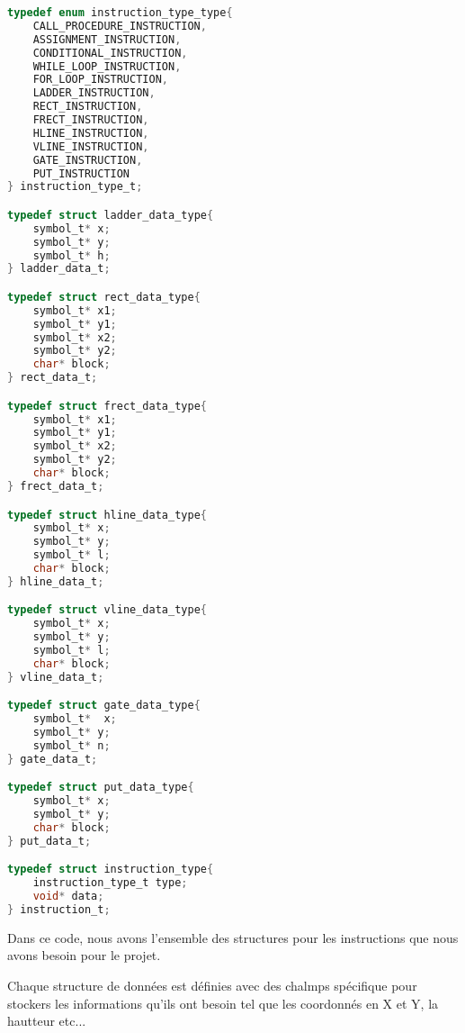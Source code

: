 \lstset{style=mystyle}
\begin{lstlisting}[language=C, caption=Structure pour une instruction]
typedef enum instruction_type_type{
    CALL_PROCEDURE_INSTRUCTION,
    ASSIGNMENT_INSTRUCTION,
    CONDITIONAL_INSTRUCTION,
    WHILE_LOOP_INSTRUCTION,
    FOR_LOOP_INSTRUCTION,
    LADDER_INSTRUCTION,
    RECT_INSTRUCTION,
    FRECT_INSTRUCTION,
    HLINE_INSTRUCTION,
    VLINE_INSTRUCTION,
    GATE_INSTRUCTION,
    PUT_INSTRUCTION
} instruction_type_t;

typedef struct ladder_data_type{
    symbol_t* x;
    symbol_t* y;
    symbol_t* h;
} ladder_data_t;

typedef struct rect_data_type{
    symbol_t* x1;
    symbol_t* y1;
    symbol_t* x2;
    symbol_t* y2;
    char* block;
} rect_data_t;

typedef struct frect_data_type{
    symbol_t* x1;
    symbol_t* y1;
    symbol_t* x2;
    symbol_t* y2;
    char* block;
} frect_data_t;

typedef struct hline_data_type{
    symbol_t* x;
    symbol_t* y;
    symbol_t* l;
    char* block;
} hline_data_t;

typedef struct vline_data_type{
    symbol_t* x;
    symbol_t* y;
    symbol_t* l;
    char* block;
} vline_data_t;

typedef struct gate_data_type{
    symbol_t*  x;
    symbol_t* y;
    symbol_t* n;
} gate_data_t;

typedef struct put_data_type{
    symbol_t* x;
    symbol_t* y;
    char* block;
} put_data_t;

typedef struct instruction_type{
    instruction_type_t type;
    void* data;
} instruction_t;
\end{lstlisting}

Dans ce code, nous avons l'ensemble des structures pour les instructions que nous avons besoin pour le projet.

Chaque structure de données est définies avec des chalmps spécifique pour stockers les informations qu'ils ont besoin tel que les coordonnés en X et Y, la hautteur etc...

\newpage